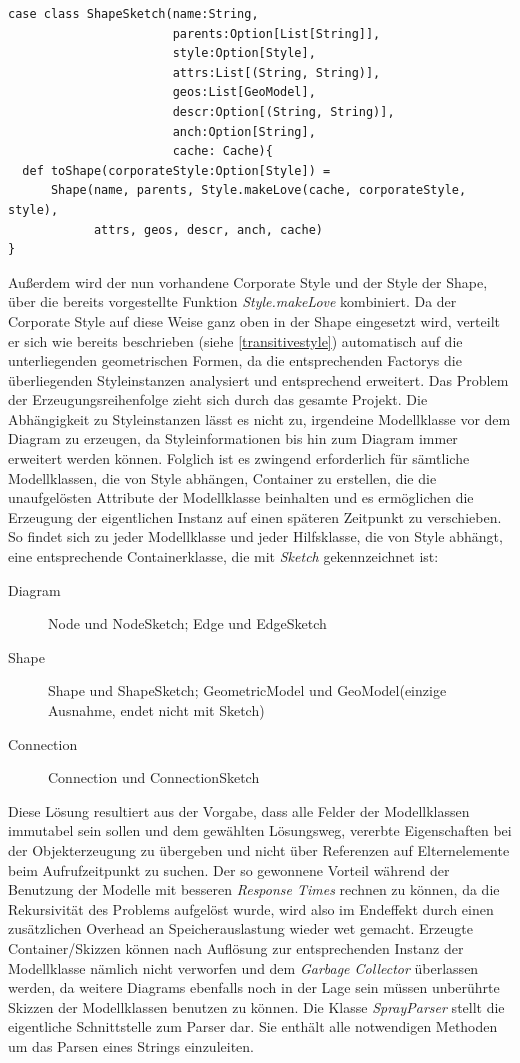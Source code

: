 \begin{lstlisting}[style=scala]
case class ShapeSketch(name:String,
                       parents:Option[List[String]],
                       style:Option[Style],
                       attrs:List[(String, String)],
                       geos:List[GeoModel],
                       descr:Option[(String, String)],
                       anch:Option[String],
                       cache: Cache){
  def toShape(corporateStyle:Option[Style]) = 
      Shape(name, parents, Style.makeLove(cache, corporateStyle, style),
            attrs, geos, descr, anch, cache)
}
\end{lstlisting}Außerdem wird der nun vorhandene Corporate Style und der Style der Shape, über die bereits vorgestellte Funktion \textit{Style.makeLove} kombiniert. Da der Corporate Style auf diese Weise ganz oben in der Shape eingesetzt wird, verteilt er sich wie bereits beschrieben (siehe \ref{transitivestyle}) automatisch auf die unterliegenden geometrischen Formen, da die entsprechenden Factorys die überliegenden Styleinstanzen analysiert und entsprechend erweitert. Das Problem der Erzeugungsreihenfolge zieht sich durch das gesamte Projekt. Die Abhängigkeit zu Styleinstanzen lässt es nicht zu, irgendeine Modellklasse vor dem Diagram zu erzeugen, da Styleinformationen bis hin zum Diagram immer erweitert werden können.
Folglich ist es zwingend erforderlich für sämtliche Modellklassen, die von Style abhängen, Container zu erstellen, die die unaufgelösten Attribute der Modellklasse beinhalten und es ermöglichen die Erzeugung der eigentlichen Instanz auf einen späteren Zeitpunkt zu verschieben. So findet sich zu jeder Modellklasse und jeder Hilfsklasse, die von Style abhängt, eine entsprechende Containerklasse, die mit \textit{Sketch} gekennzeichnet ist:
\begin{description}
\item[Diagram] Node und NodeSketch; Edge und EdgeSketch
\item[Shape] Shape und ShapeSketch; GeometricModel und GeoModel(einzige Ausnahme, endet nicht mit Sketch)
\item[Connection] Connection und ConnectionSketch
\end{description}Diese Lösung resultiert aus der Vorgabe, dass alle Felder der Modellklassen immutabel sein sollen und dem gewählten Lösungsweg, vererbte Eigenschaften bei der Objekterzeugung zu übergeben und nicht über Referenzen auf Elternelemente beim Aufrufzeitpunkt zu suchen. Der so gewonnene Vorteil während der Benutzung der Modelle mit besseren \textit{Response Times} rechnen zu können, da die Rekursivität des Problems aufgelöst wurde, wird also im Endeffekt durch einen zusätzlichen Overhead an Speicherauslastung wieder wet gemacht. Erzeugte Container/Skizzen können nach Auflösung zur entsprechenden Instanz der Modellklasse nämlich nicht verworfen und dem \textit{Garbage Collector} überlassen werden, da weitere Diagrams ebenfalls noch in der Lage sein müssen unberührte Skizzen der Modellklassen benutzen zu können. Die Klasse \textit{SprayParser} stellt die eigentliche Schnittstelle zum Parser dar. Sie enthält alle notwendigen Methoden um das Parsen eines Strings einzuleiten. 
